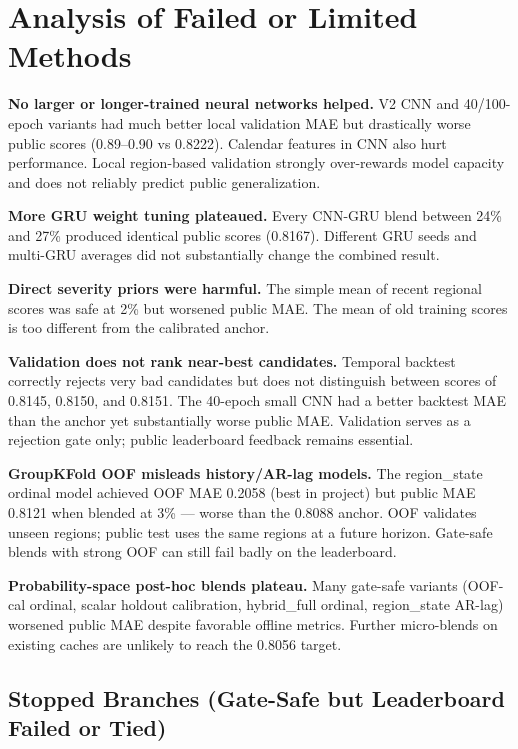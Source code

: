 \documentclass[12pt, a4paper]{article}
\begin{document}
\section{Analysis of Failed or Limited Methods}

\textbf{No larger or longer-trained neural networks helped.} V2 CNN and 40/100-epoch variants had much better local validation MAE but drastically worse public scores (0.89--0.90 vs 0.8222). Calendar features in CNN also hurt performance. Local region-based validation strongly over-rewards model capacity and does not reliably predict public generalization.

\textbf{More GRU weight tuning plateaued.} Every CNN-GRU blend between 24\% and 27\% produced identical public scores (0.8167). Different GRU seeds and multi-GRU averages did not substantially change the combined result.

\textbf{Direct severity priors were harmful.} The simple mean of recent regional scores was safe at 2\% but worsened public MAE. The mean of old training scores is too different from the calibrated anchor.

\textbf{Validation does not rank near-best candidates.} Temporal backtest correctly rejects very bad candidates but does not distinguish between scores of 0.8145, 0.8150, and 0.8151. The 40-epoch small CNN had a better backtest MAE than the anchor yet substantially worse public MAE. Validation serves as a rejection gate only; public leaderboard feedback remains essential.

\textbf{GroupKFold OOF misleads history/AR-lag models.} The region\_state ordinal model achieved OOF MAE 0.2058 (best in project) but public MAE 0.8121 when blended at 3\% --- worse than the 0.8088 anchor. OOF validates unseen regions; public test uses the same regions at a future horizon. Gate-safe blends with strong OOF can still fail badly on the leaderboard.

\textbf{Probability-space post-hoc blends plateau.} Many gate-safe variants (OOF-cal ordinal, scalar holdout calibration, hybrid\_full ordinal, region\_state AR-lag) worsened public MAE despite favorable offline metrics. Further micro-blends on existing caches are unlikely to reach the 0.8056 target.

\subsection{Stopped Branches (Gate-Safe but Leaderboard Failed or Tied)}
\end{document}
